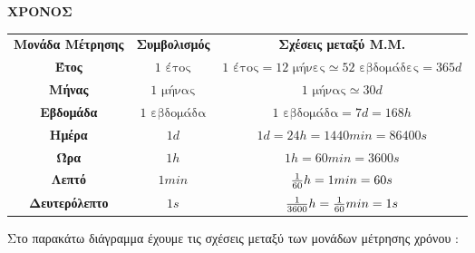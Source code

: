 \documentclass[twoside,10pt]{book}
\DeclareRobustCommand{\frac}[3][0pt]{%
{\begingroup\hspace{#1}#2\hspace{#1}\endgroup\over\hspace{#1}#3\hspace{#1}}}
\begin{document}
\begin{center}
\textbf{ΧΡΟΝΟΣ}\\\vspace{3mm}
\begin{tabular}{ccc}
\hline \rule[-2ex]{0pt}{5.5ex}\textbf{Μονάδα Μέτρησης} & \textbf{Συμβολισμός} & \textbf{Σχέσεις μεταξύ Μ.Μ.} \\ 
\hhline{===} \rule[-2ex]{0pt}{5.5ex} \textbf{Έτος} & $ 1\textrm{ έτος} $ & $ 1\textrm{ έτος}=12\textrm{ μήνες}\simeq52\textrm{ εβδομάδες}=365d $ \\
\rule[-2ex]{0pt}{4ex} \textbf{Μήνας} & $ 1\textrm{ μήνας} $ & $ 1\textrm{ μήνας}\simeq30d $ \\
\rule[-2ex]{0pt}{4ex} \textbf{Εβδομάδα} & $ 1\textrm{ εβδομάδα} $ & $ 1\textrm{ εβδομάδα}=7d=168h $ \\
\rule[-2ex]{0pt}{4ex} \textbf{Ημέρα} & $ 1d $ & $ 1d=24h=1440min=86400s $ \\ 
\rule[-2ex]{0pt}{4ex} \textbf{Ώρα} & $ 1h $ & $ 1h=60min=3600s $ \\ 
\rule[-2ex]{0pt}{4ex} \textbf{Λεπτό} & $ 1min $ & $ \frac{1}{60}h=1min=60s $ \\ 
\rule[-2ex]{0pt}{4ex} \textbf{Δευτερόλεπτο} & $ 1s $ & $ \frac{1}{3600}h=\frac{1}{60}min=1s $ \\ 
\hline 
\end{tabular}
\end{center}
Στο παρακάτω διάγραμμα έχουμε τις σχέσεις μεταξύ των μονάδων μέτρησης χρόνου :\\\\
\end{document}
